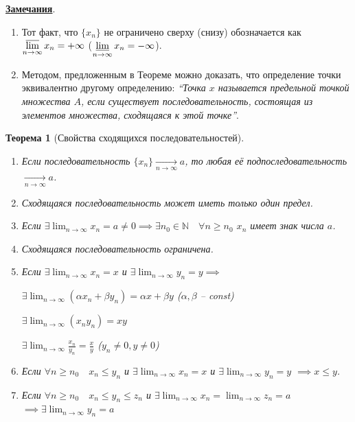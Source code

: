 \documentclass[a4paper,oneside]{article}
\newcommand{\dslim}{\displaystyle\lim}
\newcommand{\dslimn}{\dslim_{n \to \infty}}
\newtheorem{theorem}{Теорема}[subsection]
\theoremstyle{definition}
\theoremstyle{definition}
\theoremstyle{definition}
\begin{document}
\underline{\textbf{Замечания}}.
\begin{enumerate}
    \item Тот факт, что $\{x_n\}$ не ограничено сверху (снизу) обозначается как 
    $\displaystyle\varlimsup_{n \to \infty} x_n = +\infty$ 
    ($\displaystyle\varliminf_{n \to \infty} x_n = -\infty$).

    \item Методом, предложенным в Теореме можно доказать, что определение точки
    эквивалентно другому определению: \textit{``Точка $x$ называется предельной точкой
    множества $A$, если существует последовательность, состоящая из элементов
    множества, сходящаяся к этой точке''}.
\end{enumerate}

\begin{theorem}[Свойства сходящихся последовательностей]
    \begin{enumerate}
        \item Если последовательность $\{x_n\} \underset{n \to \infty}{\to} a$,
        то любая её подпоследовательность $\underset{n \to \infty}{\to} a$.
    
        \item Сходящаяся последовательность может иметь только один предел.
        \item Если $\exists \dslimn x_n = a \ne 0 \implies
        \exists n_0 \in \mathbb{N} \quad \forall n \ge n_0$ $x_n$ имеет знак числа $a$.
    
        \item Сходящаяся последовательность ограничена.
        \item Если $\exists \dslimn x_n = x$ и
        $\exists \dslimn y_n = y \implies$
    
        $\exists \dslimn (\alpha x_n + \beta y_n) = \alpha x + \beta y$
        ($\alpha, \beta$ -- const)
    
        $\exists \dslimn (x_n y_n) = x y$
    
        $\exists \dslimn \frac{x_n}{y_n} = \frac{x}{y}$
        ($y_n \ne 0, y \ne 0$)
    
        \item Если $\forall n \ge n_0 \quad x_n \le y_n$ и 
        $\exists \dslimn x_n = x$ и
        $\exists \dslimn y_n = y$ $\implies x \le y$.
    
        \item Если $\forall n \ge n_0 \quad x_n \le y_n \le z_n$ и
        $\exists \dslimn x_n = 
        \dslimn z_n = a$
        $\implies \exists \dslimn y_n = a$
    \end{enumerate}
\end{theorem}
\end{document}
